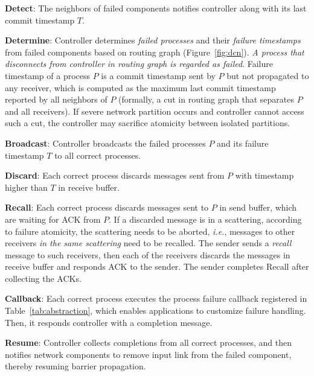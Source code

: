 \begin{ecompact}
\item \textbf{Detect}: The neighbors of failed components notifies controller along with its last commit timestamp $T$.
\item \textbf{Determine}: Controller determines \emph{failed processes} and their \emph{failure timestamps} from failed components based on routing graph (Figure~\ref{fig:dcn}). \emph{A process that disconnects from controller in routing graph is regarded as failed}.
Failure timestamp of a process $P$ is a commit timestamp sent by $P$ but not propagated to any receiver, which is computed as the maximum last commit timestamp reported by all neighbors of $P$ (formally, a cut in routing graph that separates $P$ and all receivers).
If severe network partition occurs and controller cannot access such a cut, the controller may sacrifice atomicity between isolated partitions.
\item \textbf{Broadcast}: Controller broadcasts the failed processes $P$ and its failure timestamp $T$ to all correct processes.
\item \textbf{Discard}: Each correct process discards messages sent from $P$ with timestamp higher than $T$ in receive buffer.
\item \textbf{Recall}: Each correct process discards messages sent to $P$ in send buffer, which are waiting for ACK from $P$. If a discarded message is in a scattering, according to failure atomicity, the scattering needs to be aborted, \emph{i.e.}, messages to other receivers \emph{in the same scattering} need to be recalled. The sender sends a \emph{recall} message to such receivers, then each of the receivers discards the messages in receive buffer and responds ACK to the sender. The sender completes Recall after collecting the ACKs.
\item \textbf{Callback}: Each correct process executes the process failure callback registered in Table~\ref{tab:abstraction}, which enables applications to customize failure handling. Then, it responds controller with a completion message.
\item \textbf{Resume}: Controller collects completions from all correct processes, and then notifies network components to remove input link from the failed component, thereby resuming barrier propagation.
\end{ecompact}

